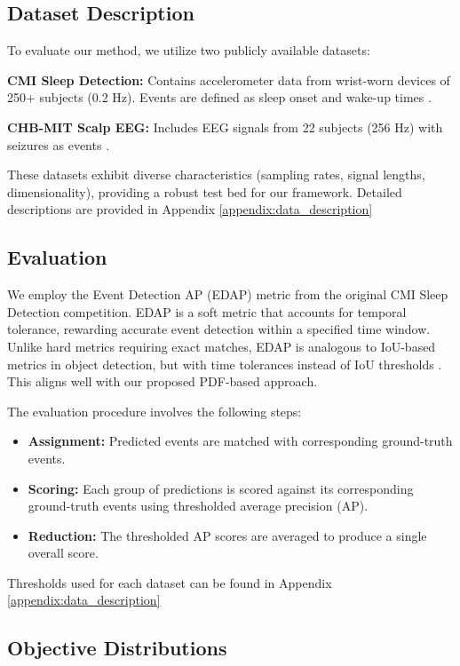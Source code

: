 \documentclass{article}
\begin{document}
\subsection{Dataset Description}
To evaluate our method, we utilize two publicly available datasets:

\textbf{CMI Sleep Detection:} Contains accelerometer data from wrist-worn devices of 250+ subjects (0.2 Hz). Events are defined as sleep onset and wake-up times \citep{alexander2017}.

\textbf{CHB-MIT Scalp EEG:} Includes EEG signals from 22 subjects (256 Hz) with seizures as events \citep{shoeb2010}.

These datasets exhibit diverse characteristics (sampling rates, signal lengths, dimensionality), providing a robust test bed for our framework. Detailed descriptions are provided in Appendix \ref{appendix:data_description}

\subsection{Evaluation}
\label{sub_section:evaluation_metric}

We employ the Event Detection AP (EDAP) metric from the original CMI Sleep Detection competition. EDAP is a soft metric that accounts for temporal tolerance, rewarding accurate event detection within a specified time window. Unlike hard metrics requiring exact matches, EDAP is analogous to IoU-based metrics in object detection, but with time tolerances instead of IoU thresholds \citep{salles2023, ram2023}. This aligns well with our proposed PDF-based approach.

The evaluation procedure involves the following steps:
\begin{itemize}
\item \textbf{Assignment:} Predicted events are matched with corresponding ground-truth events.
\item \textbf{Scoring:} Each group of predictions is scored against its corresponding ground-truth events using thresholded average precision (AP).
\item \textbf{Reduction:} The thresholded AP scores are averaged to produce a single overall score.
\end{itemize}
Thresholds used for each dataset can be found in Appendix \ref{appendix:data_description}

\subsection{Objective Distributions}
\end{document}
